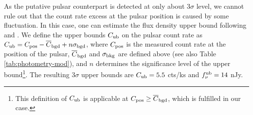 \documentclass[pdftex,twocolumn]{aastex62}
\newcommand{\gp}[1]{{\color{blue} #1}}
\begin{document}


As the putative pulsar counterpart %
is detected at only about $3\sigma$ level, we cannot rule out that the count 
rate excess at the pulsar position is caused by some fluctuation.
In this case, one can estimate the flux density upper bound following \citet{Kashyap2010} and \citet{Guillot2019}.
We define the upper bounds $C_{\rm ub}$ on the pulsar count rate as $C_{\rm ub}=C_{\rm pos}-\overline{C}_{\rm bgd}+n\sigma_{\rm bgd}$,
where 
$C_{\rm pos}$ is the measured count rate at the position of the pulsar, $\overline{C}_{\rm bgd}$ and $\sigma_{\rm bkg}$ are defined above (see also 
Table \ref{tab:photometry-mod}),
and $n$ determines the significance level of the upper bound\footnote{This 
definition of $C_{\rm ub}$ is applicable at $C_{\rm pos} \geq \overline{C}_{\rm bgd}$, which is fulfilled 
in our case.}.
The resulting 3$\sigma$ upper bounds %
are 
$C_{\rm ub}=5.5$ cts/ks and  
$f_\nu^{\rm ub} = 14$ nJy.
\end{document}
